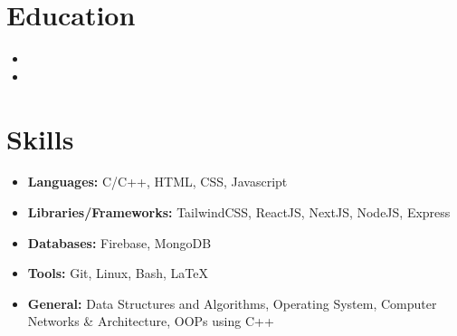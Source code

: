 \documentclass[11pt,a4paper,sans]{moderncv}
\begin{document}
\makecvtitle 

\vspace{-40pt}


\section{Education}

\vspace{6pt}

\begin{itemize}
    \item{}

    \item{}
\end{itemize}

\vspace{-10pt}


\section{Skills}

\vspace{1pt}

\begin{itemize}

\item \textbf{Languages:} C/C++, HTML, CSS, Javascript

\vspace{1pt}

\item \textbf{Libraries/Frameworks:} TailwindCSS, ReactJS, NextJS, NodeJS, Express

\vspace{1pt}

\item \textbf{Databases:} Firebase, MongoDB

\vspace{1pt}

\item \textbf{Tools:} Git, Linux, Bash, \LaTeX

\vspace{1pt}

\item \textbf{General:} Data Structures and Algorithms, Operating System, Computer Networks \& Architecture, OOPs using C++

\end{itemize}
\end{document}
